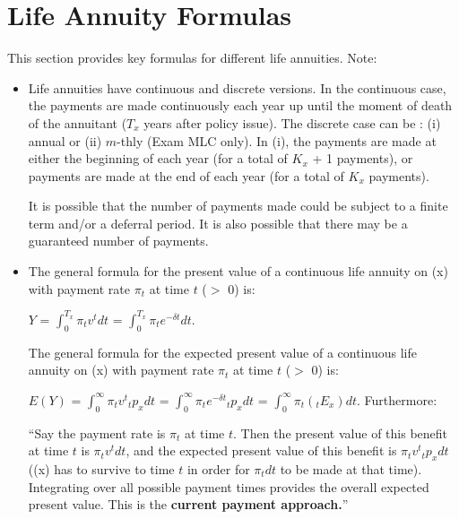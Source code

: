 \documentclass[]{book}
\begin{document}
\section{Life Annuity Formulas}\label{life-annuity-formulas}

This section provides key formulas for different life annuities. Note:

\begin{itemize}
\item
  Life annuities have continuous and discrete versions. In the
  continuous case, the payments are made continuously each year up until
  the moment of death of the annuitant (\(T_x\) years after policy
  issue). The discrete case can be : (i) annual or (ii) \(m\)-thly (Exam
  MLC only). In (i), the payments are made at either the beginning of
  each year (for a total of \(K_x\) + 1 payments), or payments are made
  at the end of each year (for a total of \(K_x\) payments).

  It is possible that the number of payments made could be subject to a
  finite term and/or a deferral period. It is also possible that there
  may be a guaranteed number of payments.
\item
  The general formula for the present value of a continuous life annuity
  on (x) with payment rate \(\pi_t\) at time \(t\) (\(>\) 0) is:

  \(Y\) = \(\int^{T_x}_0 \pi_t v^{t}dt\) =
  \(\int^{T_x}_0 \pi_t e^{-\delta t}dt\).

  The general formula for the expected present value of a continuous
  life annuity on (x) with payment rate \(\pi_t\) at time \(t\) (\(>\)
  0) is:

  \(E(Y)\) = \(\int^{\infty}_0 \pi_t v^{t}{}_{t}p_xdt\) =
  \(\int^{\infty}_0 \pi_t e^{-\delta t}{}_{t}p_xdt\) =
  \(\int^{\infty}_0 \pi_t ({}_{t}E_x)dt\). Furthermore:

  ``Say the payment rate is \(\pi_t\) at time \(t\). Then the present
  value of this benefit at time \(t\) is \(\pi_t v^{t}dt\), and the
  expected present value of this benefit is \(\pi_t v^{t}{}_{t}p_xdt\)
  ((x) has to survive to time \(t\) in order for \(\pi_tdt\) to be made
  at that time). Integrating over all possible payment times provides
  the overall expected present value. This is the \textbf{current
  payment approach.}''
\end{itemize}
\end{document}

